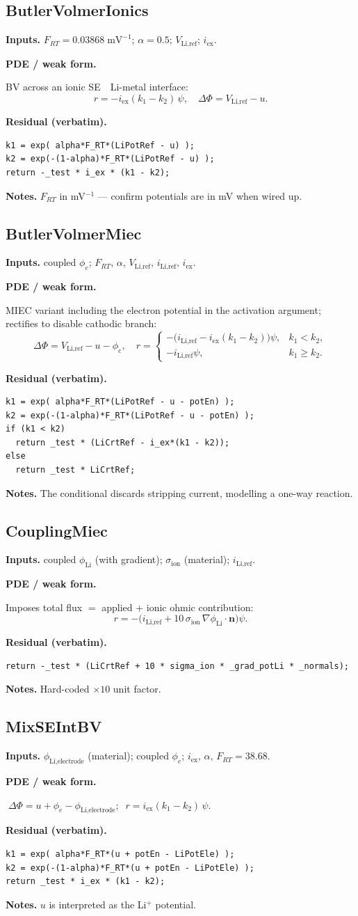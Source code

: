 \documentclass[11pt]{article}
\newcommand{\nvec}{\mathbf{n}}
\newenvironment{ecmEntry}[1]{%
  \subsection{#1}%
}{}
\newcommand{\inputsRow}[1]{\par\noindent\textbf{Inputs.} #1\par}
\newcommand{\pdeRow}[1]{\par\noindent\textbf{PDE / weak form.}\par #1\par}
\newcommand{\codeRow}{\par\noindent\textbf{Residual (verbatim).}\par}
\newcommand{\notesRow}[1]{\par\noindent\textbf{Notes.} #1\par}
\begin{document}
\begin{ecmEntry}{ButlerVolmerIonics}
\inputsRow{$F_{RT}=0.03868\;\mathrm{mV^{-1}}$; $\alpha=0.5$; $V_{\text{Li,ref}}$;
$i_{\text{ex}}$.}
\pdeRow{BV across an ionic SE \,\textbar\, Li-metal interface:
\[
  r = -i_{\text{ex}}(k_1-k_2)\,\psi,\quad
  \Delta\Phi = V_{\text{Li,ref}}-u.
\]}
\codeRow\begin{lstlisting}
k1 = exp( alpha*F_RT*(LiPotRef - u) );
k2 = exp(-(1-alpha)*F_RT*(LiPotRef - u) );
return -_test * i_ex * (k1 - k2);
\end{lstlisting}
\notesRow{$F_{RT}$ in mV$^{-1}$ — confirm potentials are in mV when wired up.}
\end{ecmEntry}

\begin{ecmEntry}{ButlerVolmerMiec}
\inputsRow{coupled $\phi_e$; $F_{RT},\,\alpha$, $V_{\text{Li,ref}},\,i_{\text{Li,ref}},\,i_{\text{ex}}$.}
\pdeRow{MIEC variant including the electron potential in the activation argument; rectifies
to disable cathodic branch:
\[
  \Delta\Phi = V_{\text{Li,ref}}-u-\phi_e,\quad
  r = \begin{cases} -\bigl(i_{\text{Li,ref}}-i_{\text{ex}}(k_1-k_2)\bigr)\psi, & k_1<k_2,\\
                     -i_{\text{Li,ref}}\psi, & k_1\ge k_2.\end{cases}
\]}
\codeRow\begin{lstlisting}
k1 = exp( alpha*F_RT*(LiPotRef - u - potEn) );
k2 = exp(-(1-alpha)*F_RT*(LiPotRef - u - potEn) );
if (k1 < k2)
  return _test * (LiCrtRef - i_ex*(k1 - k2));
else
  return _test * LiCrtRef;
\end{lstlisting}
\notesRow{The conditional discards stripping current, modelling a one-way reaction.}
\end{ecmEntry}

\begin{ecmEntry}{CouplingMiec}
\inputsRow{coupled $\phi_{\text{Li}}$ (with gradient); $\sigma_{\text{ion}}$ (material);
$i_{\text{Li,ref}}$.}
\pdeRow{Imposes total flux $=$ applied + ionic ohmic contribution:
\[
  r = -\bigl(i_{\text{Li,ref}} + 10\,\sigma_{\text{ion}}\,\nabla\phi_{\text{Li}}\!\cdot\!\nvec\bigr)\psi.
\]}
\codeRow\begin{lstlisting}
return -_test * (LiCrtRef + 10 * sigma_ion * _grad_potLi * _normals);
\end{lstlisting}
\notesRow{Hard-coded $\times 10$ unit factor.}
\end{ecmEntry}

\begin{ecmEntry}{MixSEIntBV}
\inputsRow{$\phi_{\text{Li,electrode}}$ (material); coupled $\phi_e$;
$i_{\text{ex}},\,\alpha,\,F_{RT}=38.68$.}
\pdeRow{$\;\Delta\Phi = u + \phi_e - \phi_{\text{Li,electrode}};\;\; r = i_{\text{ex}}(k_1-k_2)\,\psi$.}
\codeRow\begin{lstlisting}
k1 = exp( alpha*F_RT*(u + potEn - LiPotEle) );
k2 = exp(-(1-alpha)*F_RT*(u + potEn - LiPotEle) );
return _test * i_ex * (k1 - k2);
\end{lstlisting}
\notesRow{$u$ is interpreted as the Li$^+$ potential.}
\end{ecmEntry}
\end{document}
